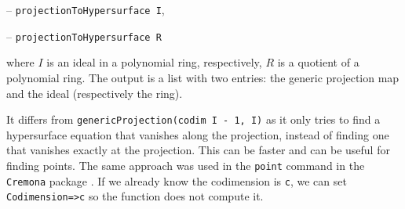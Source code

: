 \documentclass[11pt]{amsart}
\theoremstyle{definition}
\begin{document}
\vspace{0.5em}
-- {\tt projectionToHypersurface I},

-- {\tt projectionToHypersurface R} 
\vspace{0.5em}

\noindent where $I$ is an ideal in a polynomial ring, respectively, $R$ is a quotient of a polynomial ring. The output is
a list with two entries: the generic projection map and the ideal (respectively the ring).

It differs from {\tt genericProjection(codim I - 1, I)} as it only tries to find a hypersurface equation that vanishes along the projection, instead of finding one that vanishes exactly at the projection.  This can be faster and can be useful for finding points.  The same approach was used in the {\tt point} command in the {\tt Cremona} package \cite{CremonaSource}.  If we already know the codimension is {\tt c}, we can set {\tt Codimension=>c} so the function does not compute it.

\begin{comment}~~

  ~~
  
  {{\small\color{blue}
\begin{verbatim}
	i2 : R = ZZ/5[x, y, z];
	
	i3 : I = ideal(random(3, R) - 2, random(2, R));
	
	o3 : Ideal of R
	
	i4 : projectionToHypersurface(I)
	
	            ZZ                             4    3      2 2     4
	o4 = (map(R,--[y, z],{x + 2y, 2y}), ideal(y  + y z - 2y z  - 2z  - y - z))
	            5
	
    o4 : Sequence
	i5 : projectionToHypersurface(R/I)
	
	
	
                           	                    R                    
	o5 = (map(--------------------------------------------------------------
	    3       2     3            2        2       2       2     
	(- x  - 2x*y  - 2y  - x*y*z + y z - 2x*z  + 2y*z  - 2, x  - 2x
	-------------------------------------------------------------------
                                    ZZ                       
	                                    --[y, z]                 
	                                    5                       
	--------------------,----------------------------------------------
	      2               4 2    3 3       5     6     3       2     3 
	*y - y  + x*z - y*z) y z  + y z  - 2y*z  + 2z  + 2y  + 2y*z  + 2z  
	-------------------------------------------------------------------
                    	       ZZ
                	           --[y, z]
	                            5
	---,{x - z, y}), -------------------------------------------------)
	                  4 2    3 3       5     6     3       2     3
	- 1              y z  + y z  - 2y*z  + 2z  + 2y  + 2y*z  + 2z  - 1
	
	o5 : Sequence
	\end{verbatim}
    }}
\end{comment}
\end{document}
